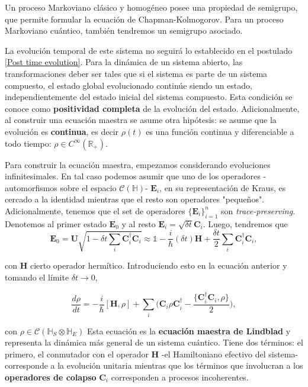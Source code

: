 \documentclass{report} %
\numberwithin{equation}{section}
\begin{document}
\begin{Omitir}
Un proceso Markoviano clásico y homogéneo posee una propiedad de semigrupo, que permite formular la ecuación de Chapman-Kolmogorov. Para un proceso Markoviano cuántico, también tendremos un semigrupo asociado.
\end{Omitir}

La evolución temporal de este sistema no seguirá lo establecido en el postulado \ref{Post time evolution}. Para la dinámica de un sistema abierto, las transformaciones deber ser tales que si el sistema es parte de un sistema compuesto, el estado global evolucionado continúe siendo un estado, independientemente del estado inicial del sistema compuesto. Esta condición se conoce como \textbf{positividad completa} \cite{Nielsen.00} de la evolución del estado. Adicionalmente, al construir una ecuación maestra se asume otra hipótesis: se asume que la evolución es \textbf{continua}, es decir $\rho(t)$ es una función continua y diferenciable a todo tiempo: $\rho \in{C}^{\infty}(\mathds{R}_{+})$.

Para construir la ecuación maestra, empezamos considerando evoluciones infinitesimales. En tal caso podemos asumir que uno de los operadores -automorfismos sobre el espacio $\mathcal{C}(\mathds{H})$- $\mathbf{E}_i$, en su representación de Kraus, es cercado a la identidad mientras que el resto son operadores "pequeños". Adicionalmente, tenemos que el set de operadores $\{\mathbf{E}_i\}_{i=1}^{n}$ son \textit{trace-preserving}. Denotemos al primer estado $\mathbf{E}_0$ y al resto $\mathbf{E}_i = \sqrt{\delta t}\mathbf{C}_i$. Luego, tendremos que 
\begin{equation*}
\mathbf{E}_0 = \mathbf{U} \sqrt{1-\delta t \sum_{i} \mathbf{C}_i^{\dagger} \mathbf{C}_i} \approx \mathds{1}  - \frac{i}{\hbar} (\delta t) \mathbf{H} + \frac{\delta t}{2} \sum_{i} \mathbf{C}_i^{\dagger} \mathbf{C}_i,
\end{equation*} 

con $\mathbf{H}$ cierto operador hermítico. Introduciendo esto en la ecuación anterior y tomando el límite $\delta t \rightarrow 0$,

\begin{equation}
    \frac{d\rho}{dt} = -\frac{i}{\hbar}[\mathbf{H},\rho]+\sum_{i}\bigg(\mathbf{C}_i \rho \mathbf{C}_i^{\dagger}-\frac{\{\mathbf{C}_i^{\dagger}\mathbf{C}_i,\rho\}}{2}\bigg),
    \label{Lindblad eq.}
\end{equation}

\noindent con $\rho \in \mathcal{C}(\mathds{H}_S \otimes\mathds{H}_E)$ Esta ecuación es la \textbf{ecuación maestra de Lindblad} y representa la dinámica más general de un sistema cuántico. Tiene dos términos: el primero, el conmutador con el operador $\mathbf{H}$ -el Hamiltoniano efectivo del sistema- corresponde a la evolución unitaria mientras que los términos que involucran a los \textbf{operadores de colapso} $\mathbf{C}_i$ corresponden a procesos incoherentes. 
\end{document}
